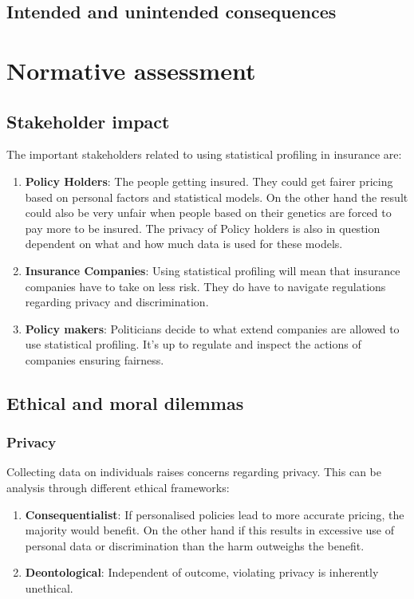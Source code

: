 \documentclass[a4paper, 12pt, table]{article}
\numberwithin{equation}{section}
\begin{document}
\subsection{Intended and unintended consequences}



\section{Normative assessment}
\subsection{Stakeholder impact}
The important stakeholders related to using statistical profiling in insurance are:
\begin{enumerate}
    \item \textbf{Policy Holders}: The people getting insured. They could get fairer pricing based on personal factors and statistical models. On the other hand the result could also be very unfair when people based on their genetics are forced to pay more to be insured. The privacy of Policy holders is also in question dependent on what and how much data is used for these models.
    \item \textbf{Insurance Companies}: Using statistical profiling will mean that insurance companies have to take on less risk. They do have to navigate regulations regarding privacy and discrimination. 
    \item \textbf{Policy makers}: Politicians decide to what extend companies are allowed to use statistical profiling. It's up to regulate and inspect the actions of companies ensuring fairness.
\end{enumerate}

\subsection{Ethical and moral dilemmas}
\subsubsection{Privacy}
Collecting data on individuals raises concerns regarding privacy. This can be analysis through different ethical frameworks:
\begin{enumerate}
    \item \textbf{Consequentialist}: If personalised policies lead to more accurate pricing, the majority would benefit. On the other hand if this results in excessive use of personal data or discrimination than the harm outweighs the benefit.   
    \item \textbf{Deontological}: Independent of outcome, violating privacy is inherently unethical.
\end{enumerate}
\end{document}
